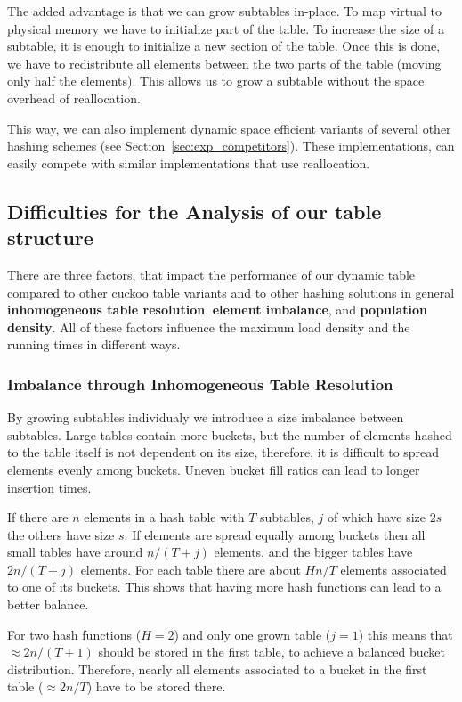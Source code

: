\documentclass[a4paper,UKenglish]{lipics-v2016}
\begin{document}
The added advantage is that we can grow subtables in-place. To map
virtual to physical memory we have to initialize part of the table. To
increase the size of a subtable, it is enough to initialize a new
section of the table.  Once this is done, we have to redistribute all
elements between the two parts of the table (moving only half the
elements).  This allows us to grow a subtable without the space
overhead of reallocation.

This way, we can also implement dynamic space efficient variants of
several other hashing schemes (see Section~\ref{sec:exp_competitors}).
These implementations, can easily compete with similar implementations
that use reallocation.

\subsection{Difficulties for the Analysis of our table structure}
There are three factors, that impact the performance of our dynamic
table compared to other cuckoo table variants and to other hashing solutions in
general \textbf{inhomogeneous table resolution}, \textbf{element imbalance}, and
\textbf{population density}. All of these factors influence the maximum load
density and the running times in different ways.

\subsubsection*{Imbalance through Inhomogeneous Table Resolution}
\label{sec:inhom_res}
By growing subtables individualy we introduce a size imbalance
between subtables.  Large tables contain more buckets, but the number
of elements hashed to the table itself is not dependent on its size,
therefore, it is difficult to spread elements evenly among buckets.
Uneven bucket fill ratios can lead to longer insertion times.

If there are $n$ elements in a hash table with $T$ subtables,
$j$ of which have size $2s$ the others have size $s$. If elements are
spread equally among buckets then all small tables have around
$n/(T+j)$ elements, and the bigger tables have $2n/(T+j)$ elements.
For each table there are about $Hn/T$ elements associated to one of
its buckets.  This shows that having more hash functions can lead to a
better balance.

For two hash functions ($H=2$) and only one grown table ($j=1$) this
means that $\approx 2n/(T+1)$ should be stored in the first table, to
achieve a balanced bucket distribution.  Therefore, nearly all
elements associated to a bucket in the first table ($\approx 2n/T$)
have to be stored there.
\end{document}
